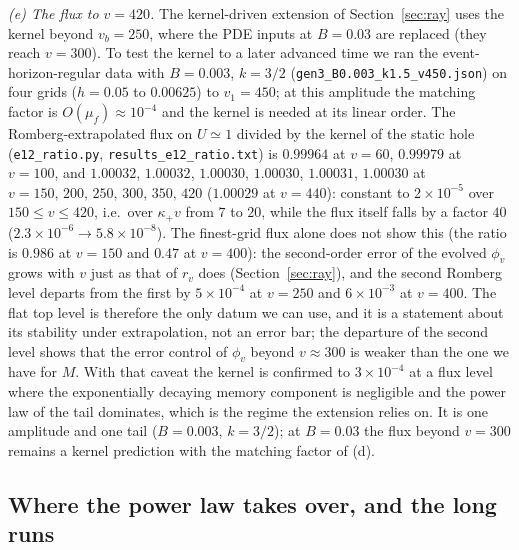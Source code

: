 \documentclass[11pt]{article}
\begin{document}
\emph{(e) The flux to $v=420$.} The kernel-driven extension of Section~\ref{sec:ray} uses the kernel beyond $v_b=250$, where the PDE inputs at $B=0.03$ are replaced (they reach $v=300$). To test the kernel to a later advanced time we ran the event-horizon-regular data with $B=0.003$, $k=3/2$ (\texttt{gen3\_B0.003\_k1.5\_v450.json}) on four grids ($h=0.05$ to $0.00625$) to $v_1=450$; at this amplitude the matching factor is $O(\mu_f)\approx10^{-4}$ and the kernel is needed at its linear order. The Romberg-extrapolated flux on $U\simeq1$ divided by the kernel of the static hole (\texttt{e12\_ratio.py}, \texttt{results\_e12\_ratio.txt}) is $0.99964$ at $v=60$, $0.99979$ at $v=100$, and $1.00032$, $1.00032$, $1.00030$, $1.00030$, $1.00031$, $1.00030$ at $v=150,\,200,\,250,\,300,\,350,\,420$ ($1.00029$ at $v=440$): constant to $2\times10^{-5}$ over $150\le v\le420$, i.e.\ over $\kappa_+v$ from $7$ to $20$, while the flux itself falls by a factor $40$ ($2.3\times10^{-6}\to5.8\times10^{-8}$). The finest-grid flux alone does not show this (the ratio is $0.986$ at $v=150$ and $0.47$ at $v=400$): the second-order error of the evolved $\phi_v$ grows with $v$ just as that of $r_v$ does (Section~\ref{sec:ray}), and the second Romberg level departs from the first by $5\times10^{-4}$ at $v=250$ and $6\times10^{-3}$ at $v=400$. The flat top level is therefore the only datum we can use, and it is a statement about its stability under extrapolation, not an error bar; the departure of the second level shows that the error control of $\phi_v$ beyond $v\approx300$ is weaker than the one we have for $M$. With that caveat the kernel is confirmed to $3\times10^{-4}$ at a flux level where the exponentially decaying memory component is negligible and the power law of the tail dominates, which is the regime the extension relies on. It is one amplitude and one tail ($B=0.003$, $k=3/2$); at $B=0.03$ the flux beyond $v=300$ remains a kernel prediction with the matching factor of (d).

\subsection{Where the power law takes over, and the long runs}
\label{sec:kernel-long}
\end{document}
